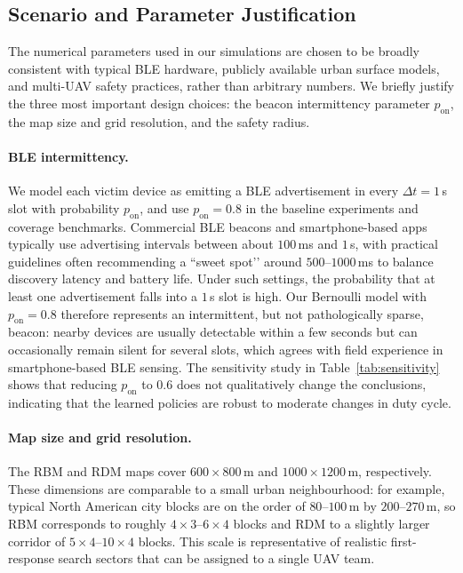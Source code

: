 \documentclass[drones,article,accept,pdftex,moreauthors]{Definitions/mdpi}
\begin{document}
\subsection{Scenario and Parameter Justification}
\label{sec:scenario-params}

The numerical parameters used in our simulations are chosen to be broadly
consistent with typical BLE hardware, publicly available urban surface
models, and multi-UAV safety practices, rather than arbitrary numbers.
We briefly justify the three most important design choices:
the beacon intermittency parameter $p_{\mathrm{on}}$, the map size and grid
resolution, and the safety radius.

\paragraph{BLE intermittency.}
We model each victim device as emitting a BLE advertisement in every
$\Delta t = 1$\,s slot with probability $p_{\mathrm{on}}$, and use
$p_{\mathrm{on}} = 0.8$ in the baseline experiments and coverage benchmarks.
Commercial BLE beacons and smartphone-based apps typically use advertising
intervals between about $100$\,ms and $1$\,s, with practical guidelines
often recommending a “sweet spot’’ around $500$–$1000$\,ms to balance
discovery latency and battery life.
Under such settings, the probability that at least one advertisement
falls into a $1$\,s slot is high. Our Bernoulli model with
$p_{\mathrm{on}} = 0.8$ therefore represents an intermittent, but not
pathologically sparse, beacon: nearby devices are usually detectable
within a few seconds but can occasionally remain silent for several slots,
which agrees with field experience in smartphone-based BLE sensing.
The sensitivity study in Table~\ref{tab:sensitivity} shows that reducing
$p_{\mathrm{on}}$ to $0.6$ does not qualitatively change the conclusions,
indicating that the learned policies are robust to moderate changes in
duty cycle.

\paragraph{Map size and grid resolution.}
The RBM and RDM maps cover $600\times800$\,m and $1000\times1200$\,m,
respectively. These dimensions are comparable to a small urban
neighbourhood: for example, typical North American city blocks are on the
order of $80$–$100$\,m by $200$–$270$\,m, so RBM corresponds
to roughly $4\times3$–$6\times4$ blocks and RDM to a slightly larger
corridor of $5\times4$–$10\times4$ blocks. This scale is representative
of realistic first-response search sectors that can be assigned to a
single UAV team.
\end{document}
